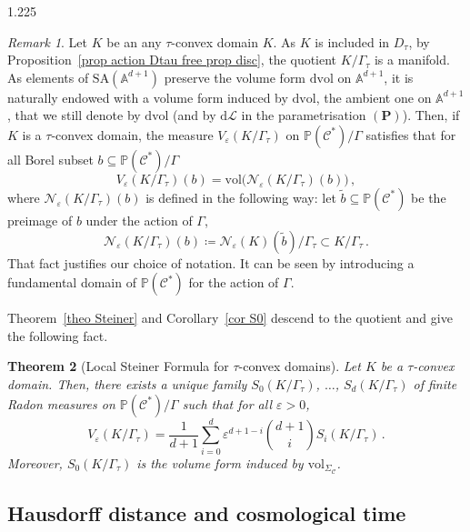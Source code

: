 \documentclass[reqno, a4paper]{amsart}
\numberwithin{equation}{section}
\numberwithin{figure}{section}
\newtheorem{theorem}{Theorem}[section]
\theoremstyle{definition}
\theoremstyle{remark}
\newtheorem{remark}[theorem]{Remark}
\newcommand{\A}{\mathbb{A}} %
\renewcommand{\P}{\mathbb{P}} %
\newcommand{\SA}{\mathrm{SA}} %
\newcommand{\dif}{\mathrm{d}} %
\newcommand{\C}{\mathcal{C}} %
\renewcommand{\S}{\Sigma_\C} %
\newcommand{\vol}{\mathrm{vol}} %
\newcommand{\dvol}{\dif \mathrm{vol}} %
\newcommand{\bp}[1]{{\bigl( {#1} \bigr)}} %
\begin{document}
\begin{spacing}{1.225}
\begin{remark} 
\label{rem induced volume} 
Let $K$ be an any $\tau$-convex domain $K$. As $K$ is included in $D_\tau$, by Proposition~\ref{prop action Dtau free prop disc}, the quotient $K/\Gamma_\tau$ is a manifold. As elements of $\SA(\A^{d+1})$ preserve the volume form $\dvol$ on $\A^{d+1}$, it is naturally endowed with a volume form induced by $\dvol$, the ambient one on $\A^{d+1}$, that we still denote by $\dvol$ (and by $\dif \mathcal{L}$ in the parametrisation $(\mathbf{P})$). Then, if $K$ is a $\tau$-convex domain, the measure $V_\varepsilon(K/\Gamma_\tau)$ on $\P(\C^*)/\Gamma$ satisfies that for all Borel subset $b \subseteq \P(\C^*)/\Gamma$
\begin{equation*}
 V_\varepsilon(K/\Gamma_\tau)(b) = \vol\bp{\mathcal{N}_\varepsilon(K/\Gamma_\tau)(b)} \, ,
\end{equation*}
where $\mathcal{N}_\varepsilon(K/\Gamma_\tau)(b)$ is defined in the following way: let $\tilde b \subseteq \P(\C^*)$ be the preimage of $b$ under the action of $\Gamma$,
\begin{equation*}
 \mathcal{N}_\varepsilon(K/\Gamma_\tau)(b) \coloneqq \mathcal{N}_\varepsilon(K)(\tilde b)/\Gamma_\tau \subset K/\Gamma_\tau \, . 
\end{equation*}
That fact justifies our choice of notation. It can be seen by introducing a fundamental domain of $\P(\C^*)$ for the action of $\Gamma$. 
\end{remark}

Theorem~\ref{theo Steiner} and Corollary~\ref{cor S0} descend to the quotient and give the following fact. 

\begin{theorem}[Local Steiner Formula for $\tau$-convex domains]
\label{theo Steiner tau-convex}
Let $K$ be a $\tau$-convex domain. Then, there exists a unique family $S_0(K/\Gamma_\tau)$, $\dots$, $S_d(K/\Gamma_\tau)$ of finite Radon measures on $\P(\C^*)/\Gamma$ such that for all $\varepsilon>0$,
\begin{equation*}
V_\varepsilon(K/\Gamma_\tau) = \frac{1}{d+1}\sum_{i=0}^{d}\varepsilon^{d+1-i} \binom{d+1}{i} S_i(K/\Gamma_\tau) \, . 
\end{equation*}
Moreover, $S_0(K/\Gamma_\tau)$ is the volume form induced by $\vol_{\S}$. 
\end{theorem}

\subsection{Hausdorff distance and cosmological time}


\end{spacing}
\end{document}
